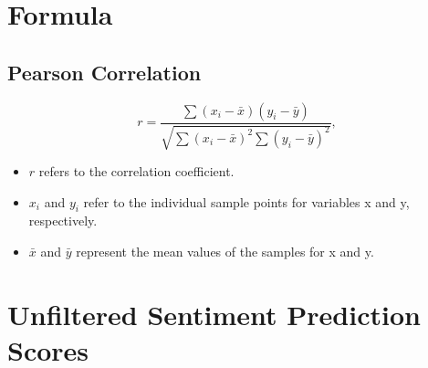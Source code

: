 \documentclass[logo,bsc,singlespacing,parskip]{infthesis}
\begin{document}
\chapter{Formula}

\section{Pearson Correlation}
\label{pearson-formula}
\begin{equation}
    r = \frac{\sum (x_i - \bar{x})(y_i - \bar{y})}{\sqrt{\sum (x_i - \bar{x})^2 \sum (y_i - \bar{y})^2}},
\end{equation}

\begin{itemize}
    \item $r$ refers to the correlation coefficient.
    \item  $x_i$ and $y_i$ refer to the individual sample points for variables x and y, respectively. 
    \item $\bar{x}$ and $\bar{y}$ represent the mean values of the samples for x and y.
\end{itemize}
\cite{WikipediaPearson2024}

\chapter{Unfiltered Sentiment Prediction Scores}
\end{document}
